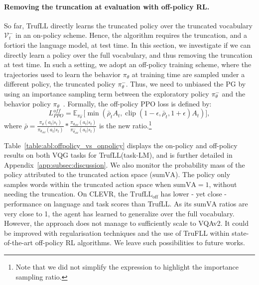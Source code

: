 \documentclass{article}
\newcommand{\Voc}{\mathcal{V}}
\newcommand{\params}{\theta}
\newcommand{\policy}{\pi_{\params}}
\newcommand{\policyold}{\pi_{\params_{old}}}
\newcommand{\exploration}{\pi^{-}_{\params}}
\newcommand{\explorationold}{\pi^{-}_{\params_{old}}}
\newcommand{\algo}{TrufLL\xspace}
\DeclareMathOperator{\clip}{clip}
\begin{document}
\paragraph{Removing the truncation at evaluation with off-policy RL.}
So far, \algo directly learns the truncated policy over the truncated vocabulary $\Voc_t^-$ in an on-policy scheme. Hence, the algorithm requires the truncation, and a fortiori the language model, at test time. In this section, we investigate if we can directly learn a policy over the full vocabulary, and thus removing the truncation at test time. In such a  setting, we adopt an off-policy training scheme, where the trajectories used to learn the behavior $\policy$ at training time are sampled under a different policy, the truncated policy $\policy^{-}$.
Thus, we need to unbiased the PG by using an importance sampling term between the exploratory policy $\policy^{-}$ and the behavior policy $\policy$~\cite{degris2012off}. %
Formally, the off-policy PPO loss is defined by:
\begin{equation*}
    L^{off}_{PPO} = \mathbb{E}_{\exploration}\big[\min (\bar{\rho}_t A_t, \clip(1-\epsilon, \bar{\rho}_t, 1 + \epsilon)A_t)\big], 
\label{eq:offpolicyPPO}
\end{equation*}  
where $\bar{\rho} = \frac{\policy(a_t|s_t)}{\policyold(a_t|s_t)} * \frac{\policyold(a_t|s_t)}{\explorationold(a_t|s_t)}$ is the new ratio.\footnote{Note that we did not simplify the expression to highlight the importance sampling ratio.} 

Table~\ref{table:abl:offpolicy_vs_onpolicy} displays the on-policy and off-policy results on both VQG tasks for \algo(task-LM), and is further detailed in Appendix~\ref{app:subsec:discussion}.
We also monitor the probability mass of the policy attributed to the truncated action space ($\mathrm{sumVA}$). 
The policy only samples words within the truncated action space when $\mathrm{sumVA}=1$, without needing the truncation. 
On CLEVR, the $\mathrm{\algo}_{\mathrm{off}}$ has lower - yet close - performance on language and task scores than \algo. As its $\mathrm{sumVA}$ ratios are very close to 1, the agent has learned to generalize over the full vocabulary. However, the approach does not manage to sufficiently scale to VQAv2. It 
could be improved with regularisation techniques and the use of TruFLL within state-of-the-art off-policy RL algorithms. We leave such possibilities to future works. 
\end{document}
